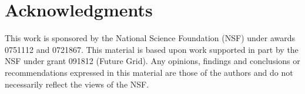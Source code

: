 \documentclass[twocolumn]{svjour3}
\begin{document}
\section*{Acknowledgments}

This work is sponsored by the National Science Foundation (NSF) under awards
0751112 and 0721867.  This material is based upon work supported in part by the
NSF under grant 091812 (Future Grid).  Any opinions, findings and conclusions
or recommendations expressed in this material are those of the authors and do
not necessarily reflect the views of the NSF.



\end{document}

